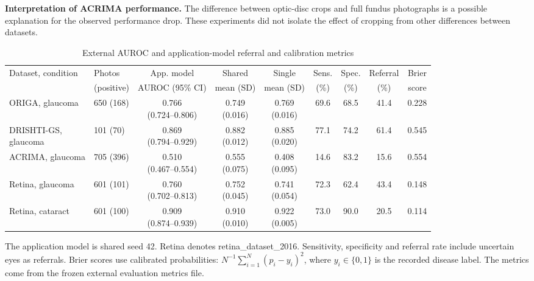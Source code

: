 \documentclass[conference,a4paper]{IEEEtran}
\begin{document}
\textbf{Interpretation of ACRIMA performance.}
The difference between optic-disc crops and full fundus photographs is a possible
explanation for the observed performance drop. These experiments did not isolate
the effect of cropping from other differences between datasets.


\begin{table}[t]
\caption{External AUROC and application-model referral and calibration metrics}
\label{tab:II}\centering\small
{\footnotesize\setlength{\tabcolsep}{3pt}\renewcommand{\arraystretch}{1.35}
\begin{tabular*}{0.94\textwidth}{@{\extracolsep{\fill}}llccccccc@{}}\toprule
Dataset, condition & Photos & App. model & Shared & Single & Sens. & Spec. & Referral & Brier \\[4pt]
& (positive) & AUROC (95\% CI) & mean (SD) & mean (SD) & (\%) & (\%) & (\%) & score \\ \midrule
ORIGA, glaucoma & 650 (168) & \shortstack{0.766\\(0.724--0.806)} & \shortstack{0.749\\(0.016)} & \shortstack{0.769\\(0.016)} & 69.6 & 68.5 & 41.4 & 0.228 \\[4pt]
\shortstack[l]{DRISHTI-GS,\\glaucoma} & 101 (70) & \shortstack{0.869\\(0.794--0.929)} & \shortstack{0.882\\(0.012)} & \shortstack{0.885\\(0.020)} & 77.1 & 74.2 & 61.4 & 0.545 \\[4pt]
ACRIMA, glaucoma & 705 (396) & \shortstack{0.510\\(0.467--0.554)} & \shortstack{0.555\\(0.075)} & \shortstack{0.408\\(0.095)} & 14.6 & 83.2 & 15.6 & 0.554 \\[4pt]
Retina, glaucoma & 601 (101) & \shortstack{0.760\\(0.702--0.813)} & \shortstack{0.752\\(0.045)} & \shortstack{0.741\\(0.054)} & 72.3 & 62.4 & 43.4 & 0.148 \\[4pt]
Retina, cataract & 601 (100) & \shortstack{0.909\\(0.874--0.939)} & \shortstack{0.910\\(0.010)} & \shortstack{0.922\\(0.005)} & 73.0 & 90.0 & 20.5 & 0.114 \\[4pt] \bottomrule
\end{tabular*}}
\par\smallskip\raggedright\footnotesize
The application model is shared seed 42. Retina denotes retina\_dataset\_2016.
Sensitivity, specificity and referral rate include uncertain eyes as referrals.
Brier scores use calibrated probabilities: $N^{-1}\sum_{i=1}^{N}(p_i-y_i)^2$,
where $y_i\in\{0,1\}$ is the recorded disease label.
The metrics come from the frozen external evaluation metrics file.

\end{table}
\end{document}
